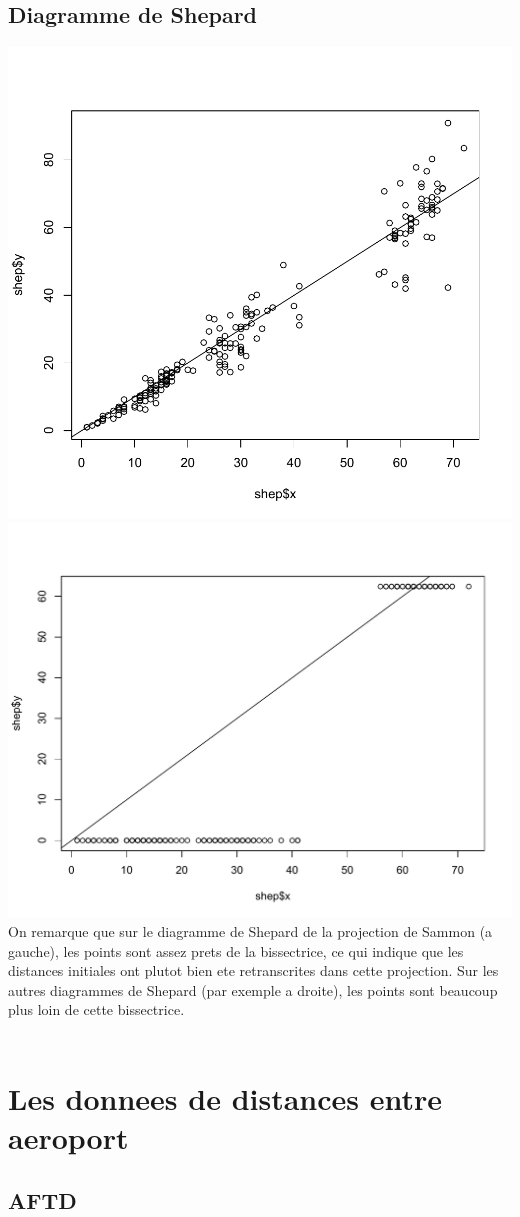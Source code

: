 \documentclass[a4paper,11pt]{article}
\begin{document}
\subsection{Diagramme de Shepard}

\hspace{-1.8cm} 
\includegraphics[width=.6\textwidth]{Exo2/shep-sam.pdf}
\includegraphics[width=.6\textwidth]{Exo2/shep.pdf}\\

\noindent On remarque que sur le diagramme de Shepard de la projection de Sammon (a gauche), les points sont assez prets de la bissectrice, ce qui indique que les distances initiales ont plutot bien ete retranscrites dans cette projection. Sur les autres diagrammes de Shepard (par exemple a droite), les points sont beaucoup plus loin de cette bissectrice.\\
\\

\section{Les donnees de distances entre aeroport}

\subsection{AFTD}
\end{document}
